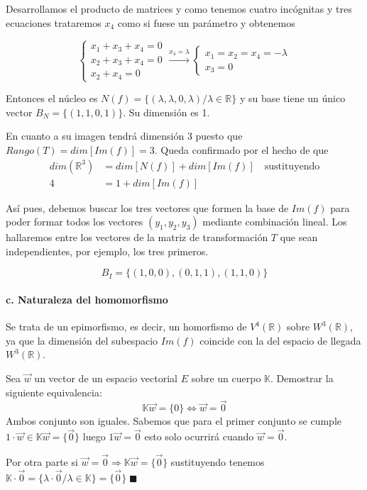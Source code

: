 \begin{problema}{\cite[12p349]{palacios}}
	Desarrollamos el producto de matrices y como tenemos cuatro incógnitas y tres
	ecuaciones trataremos $x_4$ como si fuese un parámetro y obtenemos

	$$
	\begin{cases}
		x_1+x_3+x_4=0 \\
		x_2+x_3+x_4=0 \\
		x_2+x_4=0
	\end{cases}
	\xrightarrow{\scriptstyle{x_4=\lambda}}
	\begin{cases}
		x_1=x_2=x_4=-\lambda \\
		x_3=0
	\end{cases}
	$$

	Entonces el núcleo es $N(f)=\{(\lambda,\lambda,0,\lambda)/\lambda\in\mathbb{R}\}$ y su base
	tiene un único vector $B_N=\{(1,1,0,1)\}$. Su dimensión es 1.

	En cuanto a su imagen tendrá dimensión 3 puesto que $Rango(T)=dim[Im(f)]=3$. Queda confirmado por el hecho
	de que 
	\begin{align*}
		dim(\mathbb{R}^3) &= dim[N(f)]+dim[Im(f)] \quad \scriptstyle{\text{sustituyendo}}\\
		4 &= 1 + dim[Im(f)]
	\end{align*}

	Así pues, debemos buscar los tres vectores que formen la base de $Im(f)$ para poder formar todos
	los vectores $(y_1,y_2,y_3)$ mediante combinación lineal. Los hallaremos entre los vectores
	de la matriz de transformación $T$ que sean independientes, por ejemplo, los tres primeros.

	$$B_I=\{(1,0,0), (0,1,1), (1,1,0)\}$$

	\paragraph{c. Naturaleza del homomorfismo} Se trata de un epimorfismo, es decir, un homorfismo
	de $V^4(\mathbb{R})$ sobre $W^3(\mathbb{R})$, ya que la dimensión del subespacio $Im(f)$
	coincide con la del espacio de llegada $W^3(\mathbb{R})$.
\end{problema}



\begin{problema}{\cite[89p139]{prieto2000}}{
	Sea $\vec{w}$ un vector de un espacio vectorial $E$ sobre un cuerpo $\mathbb{K}$. Demostrar
	la siguiente equivalencia:
	$$\mathbb{K}\vec{w}=\{0\} \iff \vec{w}=\vec{0}$$
	}
	Ambos conjunto son iguales. Sabemos que para el primer conjunto se cumple
	$1\cdot\vec{w}\in\mathbb{K}\vec{w}=\{\vec{0}\}$ luego $1\vec{w}=\vec{0}$ esto solo ocurrirá
	cuando $\vec{w}=\vec{0}$. 

	Por otra parte si $\vec{w}=\vec{0} \Rightarrow \mathbb{K}\vec{w}=\{\vec{0}\}$ sustituyendo
	tenemos
	$\mathbb{K}\cdot\vec{0}=\{\lambda\cdot\vec{0}/\lambda\in\mathbb{K}\}=\{\vec{0}\}\;\blacksquare$
\end{problema}


\printbibliography


